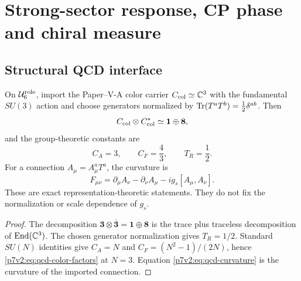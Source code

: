 \documentclass[12pt,a4paper]{article}
\newcommand{\Urole}{\mathcal U_6^{\rm role}}
\begin{document}
\section{Strong-sector response, CP phase and chiral measure}
\label{p5c:sec:organized-qcd}
\subsection{Structural QCD interface}
\label{p7v2:sec:qcd-structure}

\begin{theorem}
\label{p7v2:thm:color-dictionary}
On \(\Urole\), import the Paper--V-A color carrier
\(C_{\rm col}\simeq\mathbb{C}^3\) with the fundamental \(SU(3)\) action and choose
generators normalized by
\(\operatorname{Tr}(T^aT^b)=\tfrac12\delta^{ab}\).  Then
\begin{equation}
\label{p7v2:eq:color-decomposition}
 C_{\rm col}\otimes C_{\rm col}^{*}
 \simeq\mathbf1\oplus\mathbf8,
\end{equation}
and the group-theoretic constants are
\begin{equation}
\label{p7v2:eq:qcd-color-factors}
 C_A=3,\qquad
 C_F=\frac43,\qquad
 T_R=\frac12.
\end{equation}
For a connection \(A_\mu=A_\mu^aT^a\), the curvature is
\begin{equation}
\label{p7v2:eq:qcd-curvature}
 F_{\mu\nu}
 =
 \partial_\mu A_\nu-\partial_\nu A_\mu
 -ig_s[A_\mu,A_\nu].
\end{equation}
These are exact representation-theoretic statements.  They do not fix the
normalization or scale dependence of \(g_s\).
\end{theorem}

\begin{proof}
The decomposition
\(\mathbf3\otimes\overline{\mathbf3}=\mathbf1\oplus\mathbf8\) is the trace plus
traceless decomposition of \(\operatorname{End}(\mathbb{C}^3)\).  The chosen generator
normalization gives \(T_R=1/2\).  Standard \(SU(N)\) identities give
\(C_A=N\) and \(C_F=(N^2-1)/(2N)\), hence
\eqref{p7v2:eq:qcd-color-factors} at \(N=3\).  Equation
\eqref{p7v2:eq:qcd-curvature} is the curvature of the imported connection.
\end{proof}
\end{document}
